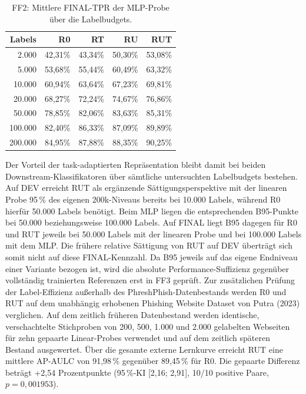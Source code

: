 \begin{table}[H]
\centering
\caption{FF2: Mittlere FINAL-TPR der MLP-Probe über die Labelbudgets.}
\label{tab:ff2_mlp}
\small
\renewcommand{\arraystretch}{0.95}
\begin{tabular}{rrrrr}
\toprule
Labels & R0 & RT & RU & RUT \\
\midrule
2.000   & 42,31\% & 43,34\% & 50,30\% & 53,08\% \\
5.000   & 53,68\% & 55,44\% & 60,49\% & 63,32\% \\
10.000  & 60,94\% & 63,64\% & 67,23\% & 69,81\% \\
20.000  & 68,27\% & 72,24\% & 74,67\% & 76,86\% \\
50.000  & 78,85\% & 82,06\% & 83,63\% & 85,31\% \\
100.000 & 82,40\% & 86,33\% & 87,09\% & 89,89\% \\
200.000 & 84,95\% & 87,88\% & 88,35\% & 90,25\% \\
\bottomrule
\end{tabular}
\end{table}

Der Vorteil der task-adaptierten Repräsentation bleibt damit bei beiden
Downstream-Klassifikatoren über sämtliche untersuchten Labelbudgets bestehen. Auf DEV erreicht RUT als
ergänzende Sättigungsperspektive mit der linearen Probe 95\,\% des eigenen
200k-Niveaus bereits bei 10.000 Labels, während R0 hierfür 50.000 Labels benötigt.
Beim MLP liegen die entsprechenden B95-Punkte bei 50.000 beziehungsweise 100.000
Labels. Auf FINAL liegt B95 dagegen für R0 und RUT jeweils bei 50.000 Labels
mit der linearen Probe und bei 100.000 Labels mit dem MLP. Die frühere relative
Sättigung von RUT auf DEV überträgt sich somit nicht auf diese FINAL-Kennzahl.
Da B95 jeweils auf das eigene Endniveau einer Variante bezogen ist, wird die
absolute Performance-Suffizienz gegenüber vollständig trainierten Referenzen erst in FF3
geprüft. Zur zusätzlichen Prüfung der Label-Effizienz außerhalb des PhreshPhish-Datenbestands werden
R0 und RUT auf dem unabhängig erhobenen Phishing Website Dataset von Putra (2023)
verglichen. Auf dem zeitlich früheren Datenbestand werden identische, verschachtelte
Stichproben von 200, 500, 1.000 und 2.000 gelabelten Webseiten für zehn gepaarte
Linear-Probes verwendet und auf dem zeitlich späteren Bestand ausgewertet. Über die gesamte externe Lernkurve erreicht RUT eine mittlere AP-AULC von 91,98\,\%
gegenüber 89,45\,\% für R0. Die gepaarte Differenz beträgt +2,54 Prozentpunkte
(95\,\%-KI [2,16; 2,91], 10/10 positive Paare, $p=0{,}001953$).

